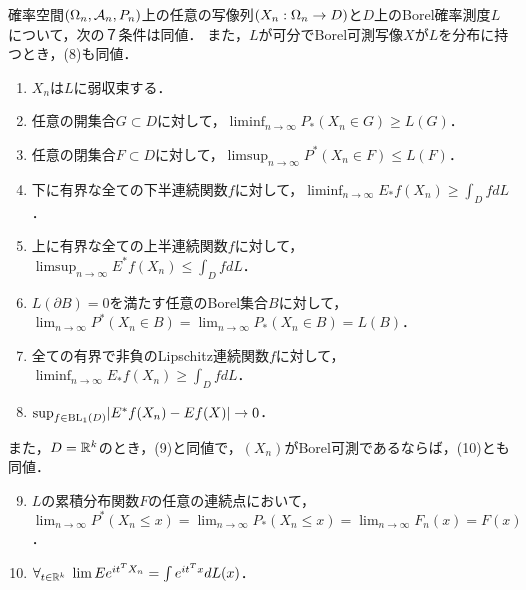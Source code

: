 \documentclass[uplatex,dvipdfmx]{jsreport}
\begin{document}
\begin{theorem}\label{thm-portmanteau}
    確率空間$(\Omega_n,\mathcal{A}_n,P_n)$上の任意の写像列$(X_n:\Omega_n\to D)$と$D$上のBorel確率測度$L$について，次の７条件は同値．
    また，$L$が可分でBorel可測写像$X$が$L$を分布に持つとき，(8)も同値．
    \begin{enumerate}
        \item $X_n$は$L$に弱収束する．
        \item 任意の開集合$G\subset D$に対して，$\liminf_{n\to\infty} P_*(X_n\in G)\ge L(G)$．
        \item 任意の閉集合$F\subset D$に対して，$\limsup_{n\to\infty} P^*(X_n\in F)\le L(F)$．
        \item 下に有界な全ての下半連続関数$f$に対して，$\liminf_{n\to\infty} E_*f(X_n)\ge\int_DfdL$．
        \item 上に有界な全ての上半連続関数$f$に対して，$\limsup_{n\to\infty}  E^*f(X_n)\le\int_DfdL$．
        \item $L(\partial B)=0$を満たす任意のBorel集合$B$に対して，$\lim_{n\to\infty} P^*(X_n\in B)=\lim_{n\to\infty} P_*(X_n\in B)=L(B)$．
        \item 全ての有界で非負のLipschitz連続関数$f$に対して，$\liminf_{n\to\infty} E_*f(X_n)\ge\int_DfdL$．
        \item $\sup_{f\in\mathrm{BL}_1(D)}\lvert E^*f(X_n)-Ef(X)\rvert\to 0$．
    \end{enumerate}
    また，$D=\mathbb{R}^k$のとき，(9)と同値で，$(X_n)$がBorel可測であるならば，(10)とも同値．
    \begin{enumerate}\setcounter{enumi}{8}
        \item $L$の累積分布関数$F$の任意の連続点において，$\lim_{n\to\infty} P^*(X_n\le x)=\lim_{n\to\infty} P_*(X_n\le x)=\lim_{n\to\infty}F_n(x)=F(x)$．
        \item $\forall_{t\in\mathbb{R}^k}\;\lim Ee^{it^TX_n}=\int e^{it^Tx}dL(x)$．
    \end{enumerate}
\end{theorem}
\end{document}
